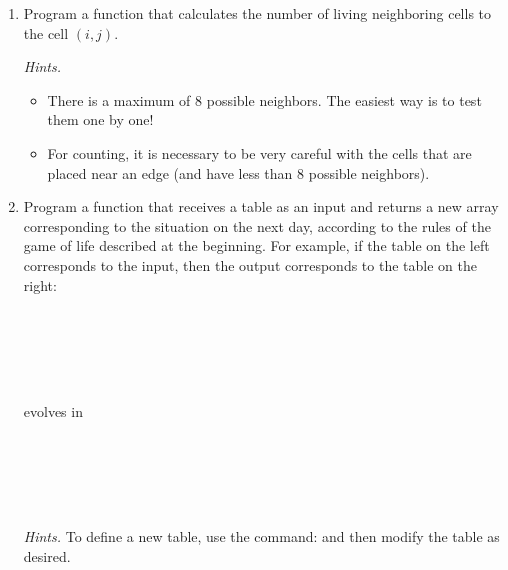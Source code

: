 \documentclass[11pt,class=report,crop=false]{standalone}
\begin{document}
\begin{activite}[Evolution]


\begin{enumerate}
  \item Program a  function that calculates the number of living neighboring cells to the cell $(i,j)$.
  
  \emph{Hints.}
  \begin{itemize}
    \item There is a maximum of $8$ possible neighbors. The easiest way is to test them one by one!
    \item For counting, it is necessary to be very careful with the cells that are placed near an edge (and have less than $8$ possible neighbors).
  \end{itemize}
  
  \item Program a  function that receives a table as an input and returns a new array corresponding to the situation on the next day, according to the rules of the game of life described at the beginning.
 For example, if the table on the left corresponds to the input, then the output corresponds to the table on the right:

\begin{center}
\begin{minipage}{0.3\textwidth}
\begin{center}
\\
\\
\\
\\
\end{center}
\end{minipage} 
 evolves in  
\begin{minipage}{0.3\textwidth}
\begin{center}
\\
\\
\\
\\
\end{center}
\end{minipage} 
\end{center}

  \emph{Hints.} To define a new table, use the command:  
  and then modify the table as desired.

\end{enumerate}
\end{activite}
\end{document}

